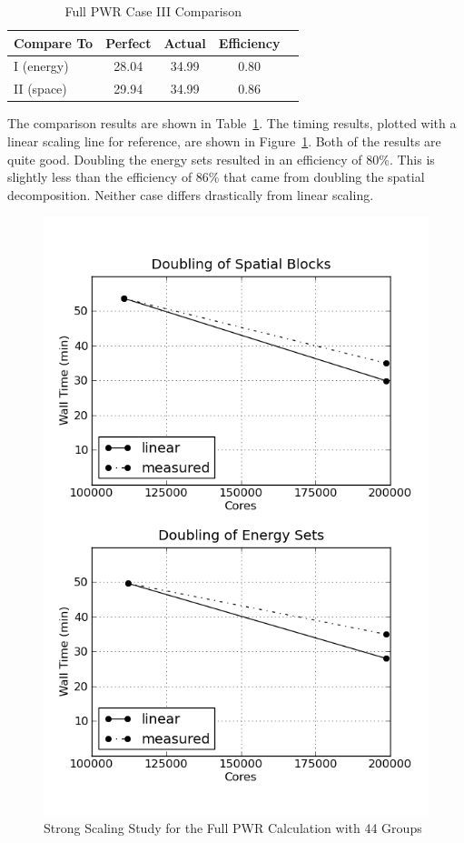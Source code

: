 \begin{table}[!h]
\caption{Full PWR Case III Comparison}
\begin{center}
\begin{tabular}{l c c c c}
\hline
Compare To & Perfect & Actual & Efficiency \\[0.5ex]
\hline
I  (energy)  & 28.04 & 34.99 & 0.80 \\
II  (space) & 29.94 & 34.99 & 0.86\\
\hline
\end{tabular}
\end{center}
\label{table:StrongPWRresults}
\end{table}
%
The comparison results are shown in Table~\ref{table:StrongPWRresults}. The timing results, plotted with a linear scaling line for reference, are shown in Figure~\ref{fig:PWRstrongScaling}. Both of the results are quite good. Doubling the energy sets resulted in an efficiency of 80\%. This is slightly less than the efficiency of 86\% that came from doubling the spatial decomposition. Neither case differs drastically from linear scaling. 
%
\begin{figure}[!h]
  \begin{center}
    \includegraphics [width=.6\textwidth, height=.75\textheight ] {PWRstrongScaling}
  \end{center}
  \caption{Strong Scaling Study for the Full PWR Calculation with 44 Groups}
  \label{fig:PWRstrongScaling}
\end{figure}

